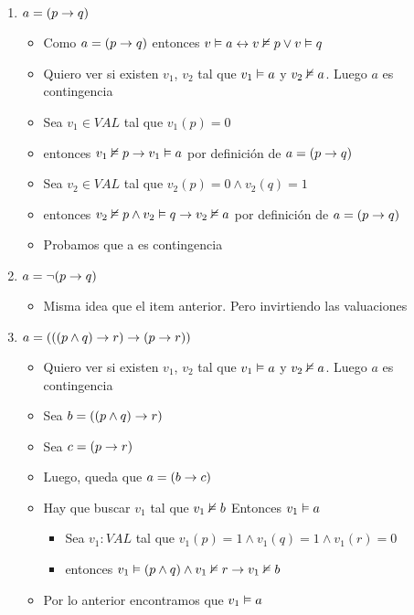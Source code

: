 \documentclass[14pt,a4paper,fleqn]{article}
\begin{document}
\begin{enumerate}
	\item $a=(p \rightarrow q) $
	\begin{itemize}
		\item Como $a=(p \rightarrow q) $ entonces $v \vDash a \leftrightarrow v \nvDash p \vee v \vDash q$
		\item Quiero ver si existen $v_{1}$, $v_{2}$ tal que $v_{1} \vDash a$ y $v_{2} \nvDash a$. Luego $a$ es contingencia
		\item Sea $v_{1} \in VAL$ tal que $v_{1}(p) = 0$ 
		\item entonces $v_{1} \nvDash p \rightarrow v_{1} \vDash a $ por definición de $a=(p \rightarrow q)$
		\item Sea $v_{2} \in VAL$ tal que $v_{2}(p) = 0 \wedge v_{2}(q)=1$ 
		\item entonces $v_{2} \nvDash p \wedge v_{2} \vDash q \rightarrow v_{2} \nvDash a $ por definición de $a=(p \rightarrow q)$
		\item Probamos que a es contingencia
	\end{itemize}
	\item $a=\neg (p \rightarrow q)$	
	\begin{itemize}
		\item Misma idea que el item anterior. Pero invirtiendo las valuaciones
	\end{itemize}
	\item $a=(((p \wedge q) \rightarrow r) \rightarrow (p \rightarrow r))$
	\begin{itemize}
		\item Quiero ver si existen $v_{1}$, $v_{2}$ tal que $v_{1} \vDash a$ y $v_{2} \nvDash a$. Luego $a$ es contingencia
		\item Sea $b = ((p \wedge q) \rightarrow r)$
		\item Sea $c = (p \rightarrow r)$	
		\item Luego, queda que $a = (b \rightarrow c)$
		\vspace{5pt}		
		\item Hay que buscar $v_{1}$ tal que $v_{1} \nvDash b $ Entonces $v_{1} \vDash a$
		\begin{itemize}
			\item Sea $v_{1}:VAL$ tal que  $v_{1}(p) = 1 \wedge v_{1}(q) = 1 \wedge v_{1}(r) = 0$
			\item entonces $v_{1} \vDash (p \wedge q) \wedge v_{1} \nvDash r \rightarrow v_{1} \nvDash b$ 
		\end{itemize}
		\item Por lo anterior encontramos que $v_{1} \vDash a$

\end{itemize}
\end{enumerate}
\end{document}
